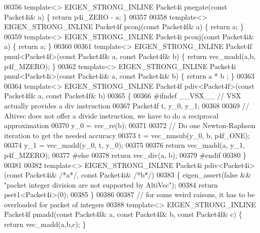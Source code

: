 \begin{DoxyCode}
{00356 \textcolor{keyword}{template}<> EIGEN\_STRONG\_INLINE Packet4i pnegate(\textcolor{keyword}{const} Packet4i& a) \{ \textcolor{keywordflow}{return} p4i\_ZERO - a; \}
00357 
00358 \textcolor{keyword}{template}<> EIGEN\_STRONG\_INLINE Packet4f pconj(\textcolor{keyword}{const} Packet4f& a) \{ \textcolor{keywordflow}{return} a; \}
00359 \textcolor{keyword}{template}<> EIGEN\_STRONG\_INLINE Packet4i pconj(\textcolor{keyword}{const} Packet4i& a) \{ \textcolor{keywordflow}{return} a; \}
00360 
00361 \textcolor{keyword}{template}<> EIGEN\_STRONG\_INLINE Packet4f pmul<Packet4f>(\textcolor{keyword}{const} Packet4f& a, \textcolor{keyword}{const} Packet4f& b) \{ \textcolor{keywordflow}{return} 
      vec\_madd(a,b, p4f\_MZERO); \}
00362 \textcolor{keyword}{template}<> EIGEN\_STRONG\_INLINE Packet4i pmul<Packet4i>(\textcolor{keyword}{const} Packet4i& a, \textcolor{keyword}{const} Packet4i& b) \{ \textcolor{keywordflow}{return} a * b
      ; \}
00363 
00364 \textcolor{keyword}{template}<> EIGEN\_STRONG\_INLINE Packet4f pdiv<Packet4f>(\textcolor{keyword}{const} Packet4f& a, \textcolor{keyword}{const} Packet4f& b)
00365 \{
00366 \textcolor{preprocessor}{#ifndef \_\_VSX\_\_  // VSX actually provides a div instruction}
00367   Packet4f t, y\_0, y\_1;
00368 
00369   \textcolor{comment}{// Altivec does not offer a divide instruction, we have to do a reciprocal approximation}
00370   y\_0 = vec\_re(b);
00371 
00372   \textcolor{comment}{// Do one Newton-Raphson iteration to get the needed accuracy}
00373   t   = vec\_nmsub(y\_0, b, p4f\_ONE);
00374   y\_1 = vec\_madd(y\_0, t, y\_0);
00375 
00376   \textcolor{keywordflow}{return} vec\_madd(a, y\_1, p4f\_MZERO);
00377 \textcolor{preprocessor}{#else}
00378   \textcolor{keywordflow}{return} vec\_div(a, b);
00379 \textcolor{preprocessor}{#endif}
00380 \}
00381 
00382 \textcolor{keyword}{template}<> EIGEN\_STRONG\_INLINE Packet4i pdiv<Packet4i>(\textcolor{keyword}{const} Packet4i& \textcolor{comment}{/*a*/}, \textcolor{keyword}{const} Packet4i& \textcolor{comment}{/*b*/})
00383 \{ eigen\_assert(\textcolor{keyword}{false} && \textcolor{stringliteral}{"packet integer division are not supported by AltiVec"});
00384   \textcolor{keywordflow}{return} pset1<Packet4i>(0);
00385 \}
00386 
00387 \textcolor{comment}{// for some weird raisons, it has to be overloaded for packet of integers}
00388 \textcolor{keyword}{template}<> EIGEN\_STRONG\_INLINE Packet4f pmadd(\textcolor{keyword}{const} Packet4f& a, \textcolor{keyword}{const} Packet4f& b, \textcolor{keyword}{const} Packet4f& c) \{ \textcolor{keywordflow}{
      return} vec\_madd(a,b,c); \}
}
\end{DoxyCode}
